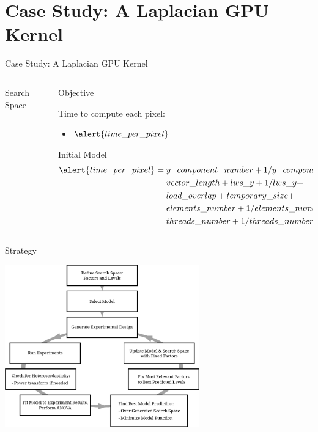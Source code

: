 \documentclass[10pt, compress, aspectratio=169, xcolor={table,usenames,dvipsnames}]{beamer}
\begin{document}
\section{Case Study: A Laplacian GPU Kernel}
\label{sec:orgb51c700}
\begin{frame}[label={sec:org6af4f4f}]{Case Study: A Laplacian GPU Kernel}
\begin{columns}
\begin{column}{0.5\columnwidth}
\begin{block}{Search Space}
\vspace{-.2cm}


\end{block}
\end{column}
\begin{column}{0.5\columnwidth}
\begin{block}{Objective}
\vspace{.2cm}

Time to compute each pixel:
\begin{itemize}
\item \(\alert{time\_per\_pixel}\)
\end{itemize}

\begin{block}{Initial Model}
\scriptsize
\begin{align*}
      \alert{time\_per\_pixel} = & \; y\_component\_number + 1 / y\_component\_number + \\
                        & \; vector\_length + lws\_y + 1 / lws\_y + \\
                        & \; load\_overlap + temporary\_size + \\
                        & \; elements\_number + 1 / elements\_number + \\
                        & \; threads\_number + 1 / threads\_number
\end{align*}
\normalsize
\end{block}
\end{block}
\end{column}
\end{columns}
\end{frame}
\begin{frame}[label={sec:orgdeb0086}]{Strategy}
\begin{center}
\includegraphics[width=0.63\textwidth]{../img/doe_anova_strategy.eps}
\end{center}
\end{frame}
\end{document}
